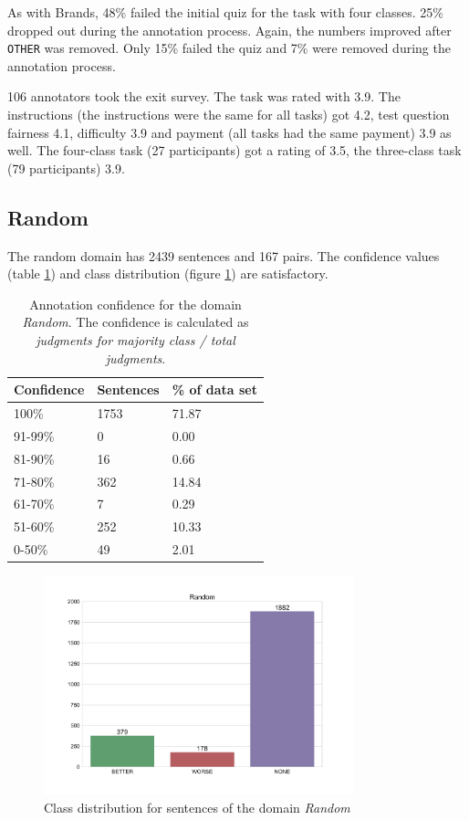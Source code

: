 As with Brands, 48\% failed the initial quiz for the task with four classes. 25\% dropped out during the annotation process. Again, the numbers improved after \texttt{OTHER} was removed. Only 15\% failed the quiz and 7\% were removed during the annotation process.

106 annotators took the exit survey. The task was rated with 3.9. The instructions (the instructions were the same for all tasks) got 4.2, test question fairness 4.1, difficulty 3.9 and payment (all tasks had the same payment) 3.9 as well. The four-class task (27 participants) got a rating of 3.5, the three-class task (79 participants) 3.9.
\subsection{Random}
The random domain has 2439 sentences and 167 pairs. The confidence values (table \ref{fig:random_agg}) and class distribution (figure \ref{fig:random_fin}) are satisfactory.
\begin{table}[h]
\caption{Annotation confidence for the domain \emph{Random}. The confidence is calculated as \emph{judgments for majority class / total judgments}.}
\label{fig:random_agg}
\begin{tabularx}{\textwidth}{XXX}
\toprule
Confidence & Sentences & \% of data set \\
\midrule
100\%	&	1753	&	71.87	 \\ 
91-99\%	&	0	&	0.00	 \\ 
81-90\%	&	16	&	0.66	 \\ 
71-80\%	&	362	&	14.84	 \\ 
61-70\%	&	7	&	0.29	 \\ 
51-60\%	&	252	&	10.33	 \\ 
0-50\%	&	49	&	2.01	 \\ 
\bottomrule
\end{tabularx}
\end{table}


\begin{figure}[h]
\centering
\caption{Class distribution for sentences of the domain \emph{Random}}
\label{fig:random_fin}
\includegraphics[width=0.8\textwidth]{images/dataset/Random-dist}
\end{figure}


